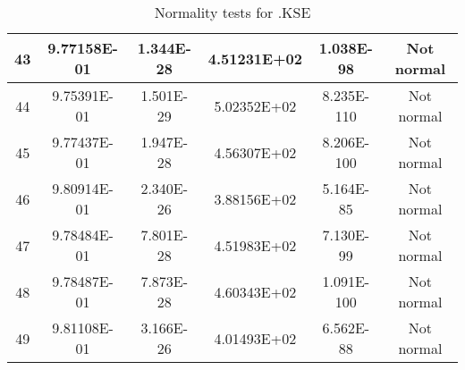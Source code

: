 \begin{table}[h]
\begin{tabular}{|c|c|c|c|c|c|}
		43 & 9.77158E-01 & 1.344E-28 & 4.51231E+02 & 1.038E-98 & Not normal\\\hline
		44 & 9.75391E-01 & 1.501E-29 & 5.02352E+02 & 8.235E-110 & Not normal\\\hline
		45 & 9.77437E-01 & 1.947E-28 & 4.56307E+02 & 8.206E-100 & Not normal\\\hline
		46 & 9.80914E-01 & 2.340E-26 & 3.88156E+02 & 5.164E-85 & Not normal\\\hline
		47 & 9.78484E-01 & 7.801E-28 & 4.51983E+02 & 7.130E-99 & Not normal\\\hline
		48 & 9.78487E-01 & 7.873E-28 & 4.60343E+02 & 1.091E-100 & Not normal\\\hline
		49 & 9.81108E-01 & 3.166E-26 & 4.01493E+02 & 6.562E-88 & Not normal\\\hline
	\end{tabular}
	\caption{Normality tests for .KSE}
\end{table}
